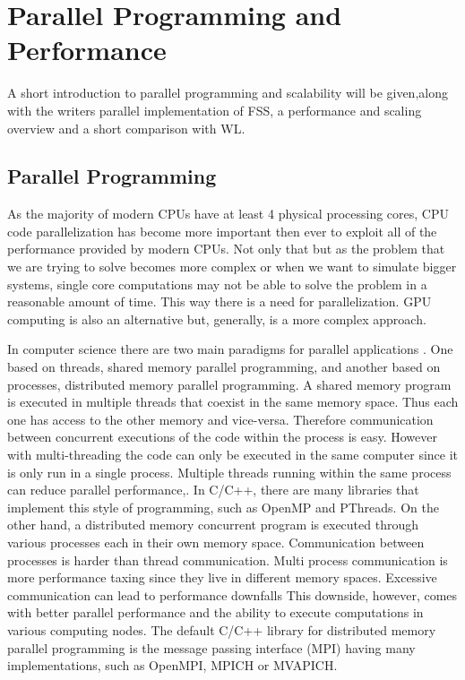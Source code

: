 \chapter{Parallel Programming and Performance}

	A short introduction to parallel programming and scalability will be given,along with the writers parallel implementation of FSS, a performance and scaling overview and a short comparison with WL.

\section{Parallel Programming}

	As the majority of modern CPUs have at least 4 physical processing cores, CPU code parallelization has become more important then ever to exploit all of the performance provided by modern CPUs. Not only that but as the problem that we are trying to solve becomes more complex or when we want to simulate bigger systems, single core computations may not be able to solve the problem in a reasonable amount of time. This way there is a need for parallelization. GPU computing is also an alternative but, generally, is a more complex approach.


	In computer science there are two main paradigms for parallel applications \cite{Hager2011}. One based on threads, shared memory parallel programming, and another based on processes, distributed memory parallel programming. 
	A shared memory program is executed in multiple threads that coexist in the same memory space. Thus each one has access to the other memory and vice-versa. Therefore communication between concurrent executions of the code within the process is easy. However with multi-threading the code can only be executed in the same computer since it is only run in a single process. Multiple threads running within the same process can reduce parallel performance,. In C/C++, there are many libraries that implement this style of programming, such as OpenMP and PThreads. 
	On the other hand, a distributed memory concurrent program is executed through various processes each in their own memory space. Communication between processes is harder than thread communication. Multi process communication is more performance taxing since they live in different memory spaces. Excessive communication can lead to performance downfalls This downside, however, comes with better parallel performance and the ability to execute computations in various computing nodes. The default C/C++ library for distributed memory parallel programming is the message passing interface (MPI) having many implementations, such as OpenMPI, MPICH or MVAPICH.


